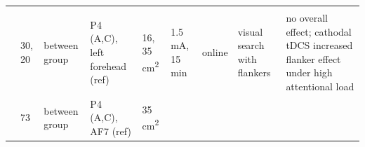 \documentclass[11pt,]{memoir}
\begin{document}
\begin{longtable}[]{@{}lllllllll@{}}
\begin{minipage}[t]{0.25\columnwidth}
\end{minipage}\tabularnewline
\begin{minipage}[t]{0.08\columnwidth}\raggedright
\textcite{Weiss2012}\strut
\end{minipage} & \begin{minipage}[t]{0.03\columnwidth}\raggedright
30,
20\strut
\end{minipage} & \begin{minipage}[t]{0.05\columnwidth}\raggedright
between
group\strut
\end{minipage} & \begin{minipage}[t]{0.15\columnwidth}\raggedright
P4 (A,C), left forehead (ref)\strut
\end{minipage} & \begin{minipage}[t]{0.04\columnwidth}\raggedright
16,
35
cm\textsuperscript{2}\strut
\end{minipage} & \begin{minipage}[t]{0.06\columnwidth}\raggedright
1.5 mA, 15
min\strut
\end{minipage} & \begin{minipage}[t]{0.05\columnwidth}\raggedright
online\strut
\end{minipage} & \begin{minipage}[t]{0.06\columnwidth}\raggedright
visual
search
with
flankers\strut
\end{minipage} & \begin{minipage}[t]{0.25\columnwidth}\raggedright
no overall effect; cathodal tDCS increased flanker
effect under high attentional load\strut
\end{minipage}\tabularnewline
\begin{minipage}[t]{0.08\columnwidth}\raggedright
\textcite{Kajimura2015}\strut
\end{minipage} & \begin{minipage}[t]{0.03\columnwidth}\raggedright
73\strut
\end{minipage} & \begin{minipage}[t]{0.05\columnwidth}\raggedright
between
group\strut
\end{minipage} & \begin{minipage}[t]{0.15\columnwidth}\raggedright
P4 (A,C), AF7 (ref)\strut
\end{minipage} & \begin{minipage}[t]{0.04\columnwidth}\raggedright
35
cm\textsuperscript{2}\strut
\end{minipage} & \begin{minipage}[t]{0.06\columnwidth}\raggedright

\end{minipage}
\end{longtable}
\end{document}
